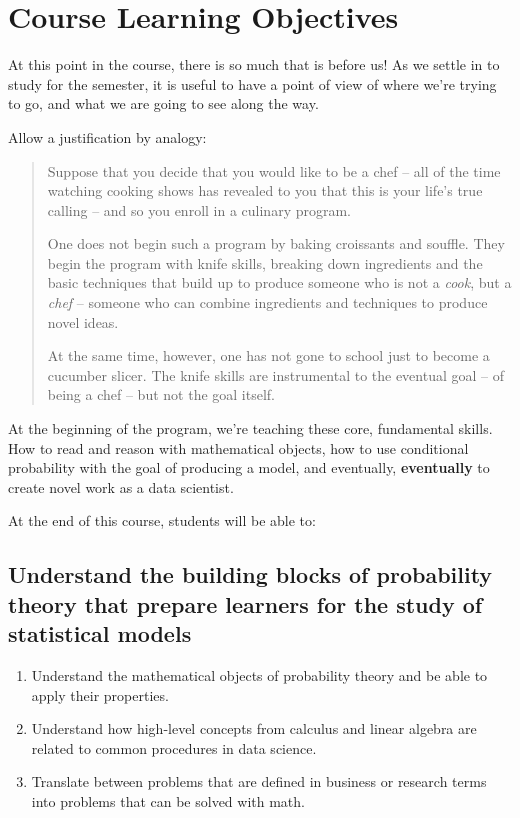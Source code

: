 \documentclass[
  letterpaper,
  DIV=11,
  numbers=noendperiod]{scrreprt}
\providecommand{\tightlist}{%
  \setlength{\itemsep}{0pt}\setlength{\parskip}{0pt}}\usepackage{longtable,booktabs,array}
\begin{document}
\section{Course Learning Objectives}\label{course-learning-objectives}

At this point in the course, there is so much that is before us! As we
settle in to study for the semester, it is useful to have a point of
view of where we're trying to go, and what we are going to see along the
way.

Allow a justification by analogy:

\begin{quote}
Suppose that you decide that you would like to be a chef -- all of the
time watching cooking shows has revealed to you that this is your life's
true calling -- and so you enroll in a culinary program.

One does not begin such a program by baking croissants and souffle. They
begin the program with knife skills, breaking down ingredients and the
basic techniques that build up to produce someone who is not a
\emph{cook}, but a \emph{chef} -- someone who can combine ingredients
and techniques to produce novel ideas.

At the same time, however, one has not gone to school just to become a
cucumber slicer. The knife skills are instrumental to the eventual goal
-- of being a chef -- but not the goal itself.
\end{quote}

At the beginning of the program, we're teaching these core, fundamental
skills. How to read and reason with mathematical objects, how to use
conditional probability with the goal of producing a model, and
eventually, \textbf{eventually} to create novel work as a data
scientist.

At the end of this course, students will be able to:

\subsection{Understand the building blocks of probability theory that
prepare learners for the study of statistical
models}\label{understand-the-building-blocks-of-probability-theory-that-prepare-learners-for-the-study-of-statistical-models}

\begin{enumerate}
\def\labelenumi{\arabic{enumi}.}
\tightlist
\item
  Understand the mathematical objects of probability theory and be able
  to apply their properties.
\item
  Understand how high-level concepts from calculus and linear algebra
  are related to common procedures in data science.
\item
  Translate between problems that are defined in business or research
  terms into problems that can be solved with math.
\end{enumerate}
\end{document}
